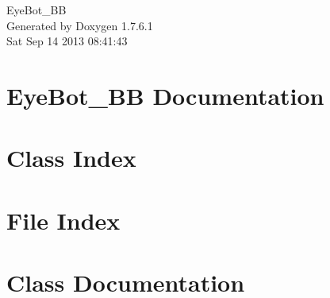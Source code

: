 \documentclass[a4paper]{book}
\begin{document}
\hypersetup{pageanchor=false,citecolor=blue}
\begin{titlepage}
\vspace*{7cm}
\begin{center}
{\Large \-Eye\-Bot\-\_\-\-B\-B }\\
\vspace*{1cm}
{\large \-Generated by Doxygen 1.7.6.1}\\
\vspace*{0.5cm}
{\small Sat Sep 14 2013 08:41:43}\\
\end{center}
\end{titlepage}
\clearemptydoublepage
{}
\tableofcontents
\clearemptydoublepage
{}
\hypersetup{pageanchor=true,citecolor=blue}
\chapter{\-Eye\-Bot\-\_\-\-B\-B \-Documentation}
\label{index}\hypertarget{index}{}
\chapter{\-Class \-Index}

\chapter{\-File \-Index}

\chapter{\-Class \-Documentation}
































\end{document}
